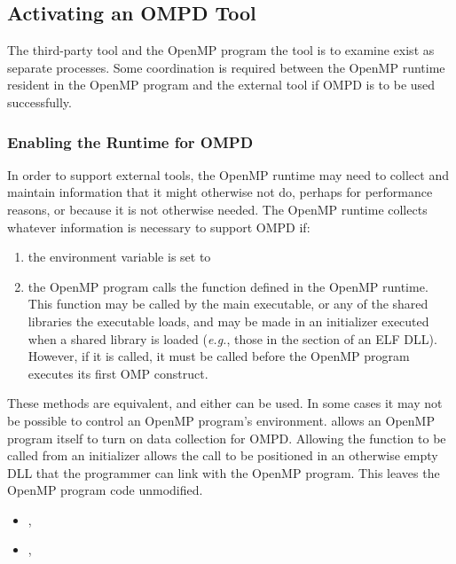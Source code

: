 \subsection{Activating an OMPD Tool}
\label{sec:ompd:activating}

The third-party tool and the OpenMP program the tool is to examine
exist as separate processes.
Some coordination is required between the OpenMP runtime resident
in the OpenMP program and the external tool if OMPD is to be used
successfully.

\subsubsection{Enabling the Runtime for OMPD}
\label{sec:ompd:enabling-ompd}

In order to support external tools, the OpenMP runtime may need to collect
and maintain information that it might otherwise not do, perhaps
for performance reasons, or because it is not otherwise needed.
The OpenMP runtime collects whatever information is necessary
to support OMPD if:
\begin{enumerate}
\item
  the environment variable  is set to 
\item
  the OpenMP program calls the
  function defined in the OpenMP runtime.
  This function may be called by the main executable, or any of the
  shared libraries the executable loads, and may be made in an
  initializer executed when a shared library is loaded
  (\textit{e.g.}, those in the  section of an ELF DLL).
  However, if it is called, it must be called before the OpenMP program
  executes its first OMP construct.
\end{enumerate}
These methods are equivalent, and either can be used.
In some cases it may not be possible to control an OpenMP program's
environment.
 allows an OpenMP program itself to turn on
data collection for OMPD.
Allowing the function to be called from an initializer allows
the call to be positioned in an otherwise empty DLL that the
programmer can link with the OpenMP program.
This leaves the OpenMP program code unmodified.

\crossreferences
\begin{itemize}
\item
  , 
\item
  , 
\end{itemize}

